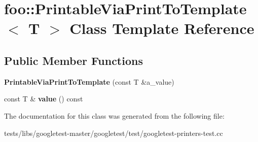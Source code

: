 \hypertarget{classfoo_1_1PrintableViaPrintToTemplate}{}\section{foo\+:\+:Printable\+Via\+Print\+To\+Template$<$ T $>$ Class Template Reference}
\label{classfoo_1_1PrintableViaPrintToTemplate}
\subsection*{Public Member Functions}
\begin{DoxyCompactItemize}
\item 
\mbox{\label{classfoo_1_1PrintableViaPrintToTemplate_a8fef9e8b59c9415624230b73469b517e}} 
{\bfseries Printable\+Via\+Print\+To\+Template} (const T \&a\+\_\+value)
\item 
\mbox{\label{classfoo_1_1PrintableViaPrintToTemplate_a14e0fcac9ae264e37e6212994b2920f6}} 
const T \& {\bfseries value} () const
\end{DoxyCompactItemize}


The documentation for this class was generated from the following file\+:\begin{DoxyCompactItemize}
\item 
tests/libs/googletest-\/master/googletest/test/googletest-\/printers-\/test.\+cc\end{DoxyCompactItemize}
